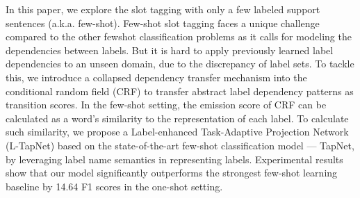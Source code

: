 In this paper, we explore the slot tagging with only a few labeled support sentences (a.k.a. few-shot). Few-shot slot tagging faces a unique challenge compared to the other fewshot classification problems as it calls for modeling the dependencies between labels. But it is hard to apply previously learned label dependencies to an unseen domain, due to the discrepancy of label sets. To tackle this, we introduce a collapsed dependency transfer mechanism into the conditional random field (CRF) to transfer abstract label dependency patterns as transition scores. In the few-shot setting, the emission score of CRF can be calculated as a word's similarity to the representation of each label. To calculate such similarity, we propose a Label-enhanced Task-Adaptive Projection Network (L-TapNet) based on the state-of-the-art few-shot classification model --- TapNet, by leveraging label name semantics in representing labels. Experimental results show that our model significantly outperforms the strongest few-shot learning baseline by 14.64 F1 scores in the one-shot setting.
